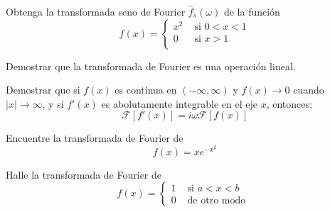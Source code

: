 \documentclass[11pt]{article}
\begin{document}
\begin{question} %
Obtenga la transformada seno de Fourier $\hat{f}_s(\omega)$ de la función
\[ f(x) = 
\begin{cases}
    x^2 & \text{ si } 0 < x < 1 \\
    0 & \text{ si } x > 1 \\
\end{cases} \]
\end{question}

\begin{question}
Demostrar que la transformada de Fourier es una operación lineal.
\end{question}

\begin{question}
Demostrar que si $f(x)$ es continua en $(-\infty, \infty)$ y $f(x) \rightarrow 0$ cuando $|x| \rightarrow \infty$, y si $f'(x)$ es abolutamente integrable en el eje $x$, entonces:
\[ \mathscr{F}[f'(x)] = i \omega \mathscr{F}[f(x)] \]
\end{question}

\begin{question} %
Encuentre la transformada de Fourier de 
\[ f(x) = x e^{-x^2} \]
\end{question}

\begin{question} %
Halle la transformada de Fourier de 
\[ f(x) = 
    \begin{cases}
        1 & \text { si } a < x < b \\
        0 & \text { de otro modo }
    \end{cases}
\]
\end{question}
\end{document}
